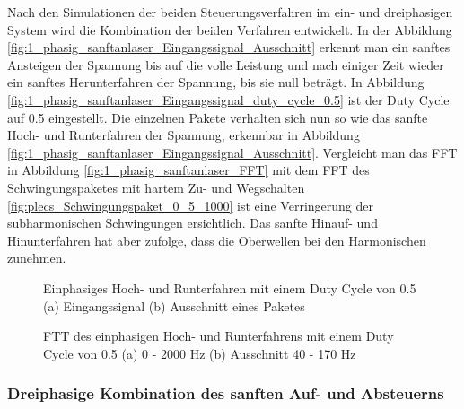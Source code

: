 Nach den Simulationen der beiden Steuerungsverfahren im ein- und dreiphasigen System wird die Kombination der beiden Verfahren entwickelt. In der Abbildung \ref{fig:1_phasig_sanftanlaser_Eingangssignal_Ausschnitt} erkennt man ein sanftes Ansteigen der Spannung bis auf die volle Leistung und nach einiger Zeit wieder ein sanftes Herunterfahren der Spannung, bis sie null beträgt. In Abbildung \ref{fig:1_phasig_sanftanlaser_Eingangssignal_duty_cycle_0.5} ist der Duty Cycle auf 0.5 eingestellt. Die einzelnen Pakete verhalten sich nun so wie das sanfte Hoch- und Runterfahren der Spannung, erkennbar in Abbildung \ref{fig:1_phasig_sanftanlaser_Eingangssignal_Ausschnitt}. Vergleicht man das FFT in Abbildung \ref{fig:1_phasig_sanftanlaser_FFT} mit dem FFT des Schwingungspaketes mit hartem Zu- und Wegschalten \ref{fig:plecs_Schwingungspaket_0_5_1000} ist eine Verringerung der subharmonischen Schwingungen ersichtlich. Das sanfte Hinauf- und Hinunterfahren hat aber zufolge, dass die Oberwellen bei den Harmonischen zunehmen. 

\begin{figure}[ht!]
	\centering
	\qquad
	\caption{Einphasiges Hoch- und Runterfahren mit einem Duty Cycle von 0.5 (a) Eingangssignal (b) Ausschnitt eines Paketes}
	\label{fig:einphasiges_Sanft_anlassen_Einganssignal}
\end{figure}

\begin{figure}[ht!]
	\centering
	\qquad
	\caption{FTT des einphasigen Hoch- und Runterfahrens mit einem Duty Cycle von 0.5 (a) 0 - 2000 Hz (b) Ausschnitt 40 - 170 Hz}
	\label{fig:einphasiges_Sanft_anlassen_FTT}
\end{figure}

\newpage
\subsubsection{Dreiphasige Kombination des sanften Auf- und Absteuerns}

